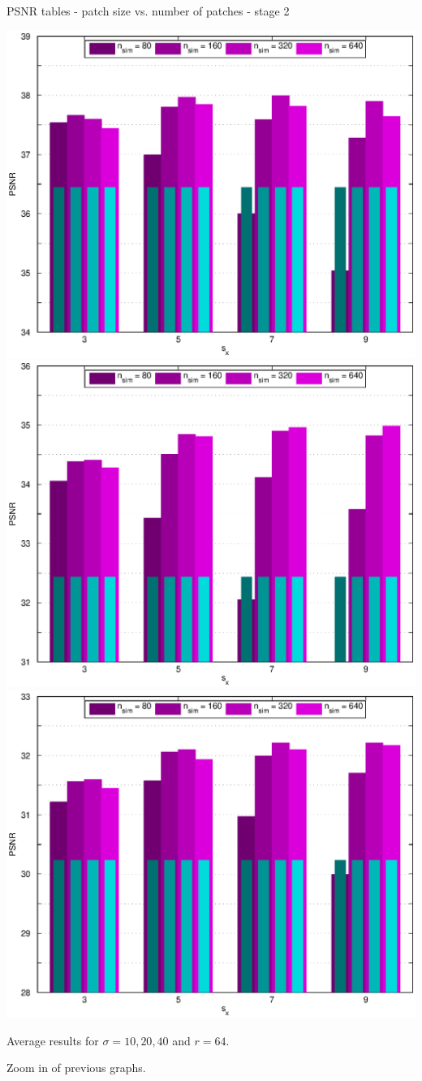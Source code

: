\documentclass[mathserif, 8pt]{beamer}
\makeatletter
\newcounter{multipleslide}
\newcommand{\restoreframe}{%
\patchcmd{\beamer@@tmpl@footline}%
	{\themultipleslide}%
	{\insertframenumber}%
	{}%
	{}%
\setcounter{framenumber}{\value{multipleslide}}%
}
\makeatother
\begin{document}
\begin{frame}{PSNR tables - patch size vs. number of patches - stage 2}
	\begin{center}
		\includegraphics[width=.33\textwidth]{zoom_psnr_px2-np2-bars_2r64_s10_average.eps}%
		\includegraphics[width=.33\textwidth]{zoom_psnr_px2-np2-bars_2r64_s20_average.eps}%
		\includegraphics[width=.33\textwidth]{zoom_psnr_px2-np2-bars_2r64_s40_average.eps}
	\end{center}
	\begin{center}
	Average results for $\sigma = 10, 20, 40$ and $r = 64$. 
	\bigskip
	
	Zoom in of previous graphs.
	\end{center}
\end{frame}
\restoreframe
\end{document}
